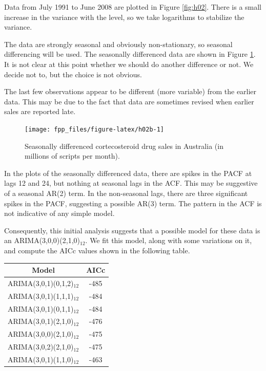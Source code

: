 \documentclass[]{book}
\newenvironment{Shaded}{\begin{snugshade}}{\end{snugshade}}
\newcommand{\DataTypeTok}[1]{\textcolor[rgb]{0.13,0.29,0.53}{#1}}
\newcommand{\DecValTok}[1]{\textcolor[rgb]{0.00,0.00,0.81}{#1}}
\newcommand{\KeywordTok}[1]{\textcolor[rgb]{0.13,0.29,0.53}{\textbf{#1}}}
\newcommand{\NormalTok}[1]{#1}
\newcommand{\OperatorTok}[1]{\textcolor[rgb]{0.81,0.36,0.00}{\textbf{#1}}}
\newcommand{\StringTok}[1]{\textcolor[rgb]{0.31,0.60,0.02}{#1}}
\begin{document}
Data from July 1991 to June 2008 are plotted in Figure \ref{fig:h02}. There is a small increase in the variance with the level, so we take logarithms to stabilize the variance.

The data are strongly seasonal and obviously non-stationary, so seasonal differencing will be used. The seasonally differenced data are shown in Figure \ref{fig:h02b}. It is not clear at this point whether we should do another difference or not. We decide not to, but the choice is not obvious.

The last few observations appear to be different (more variable) from the earlier data. This may be due to the fact that data are sometimes revised when earlier sales are reported late.

\begin{Shaded}
\end{Shaded}

\begin{figure}

{\centering \texttt{[image: fpp\_files/figure-latex/h02b-1]} 

}

\caption{Seasonally differenced cortecosteroid drug sales in Australia (in millions of scripts per month).}\label{fig:h02b}
\end{figure}

In the plots of the seasonally differenced data, there are spikes in the PACF at lags 12 and 24, but nothing at seasonal lags in the ACF. This may be suggestive of a seasonal AR(2) term. In the non-seasonal lags, there are three significant spikes in the PACF, suggesting a possible AR(3) term. The pattern in the ACF is not indicative of any simple model.

Consequently, this initial analysis suggests that a possible model for these data is an ARIMA(3,0,0)(2,1,0)\(_{12}\). We fit this model, along with some variations on it, and compute the AICc values shown in the following table.

\begin{longtable}[]{@{}cc@{}}
\toprule
Model & AICc\tabularnewline
\midrule
\endhead
ARIMA(3,0,1)(0,1,2)\(_{12}\) & -485\tabularnewline
ARIMA(3,0,1)(1,1,1)\(_{12}\) & -484\tabularnewline
ARIMA(3,0,1)(0,1,1)\(_{12}\) & -484\tabularnewline
ARIMA(3,0,1)(2,1,0)\(_{12}\) & -476\tabularnewline
ARIMA(3,0,0)(2,1,0)\(_{12}\) & -475\tabularnewline
ARIMA(3,0,2)(2,1,0)\(_{12}\) & -475\tabularnewline
ARIMA(3,0,1)(1,1,0)\(_{12}\) & -463\tabularnewline
\bottomrule
\end{longtable}
\end{document}
